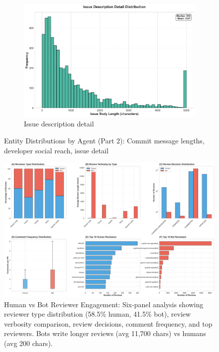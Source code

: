 \documentclass[11pt]{article}
\begin{document}
\begin{figure}[H]
\begin{subfigure}[b]{0.48\textwidth}
\centering
\includegraphics[width=\textwidth]{figures_individual/39_entity_issue_description_detail.png}
\caption{Issue description detail}
\label{fig:entity_issue}
\end{subfigure}

\caption{Entity Distributions by Agent (Part 2): Commit message lengths, developer social reach, issue detail}
\label{fig:entity_dist_part2}
\end{figure}

\begin{figure}[H]
\centering
\includegraphics[width=\textwidth]{figures/fig5_human_vs_bot_engagement.png}
\caption{Human vs Bot Reviewer Engagement: Six-panel analysis showing reviewer type distribution (58.5\% human, 41.5\% bot), review verbosity comparison, review decisions, comment frequency, and top reviewers. Bots write longer reviews (avg 11,700 chars) vs humans (avg 200 chars).}
\label{fig:human_bot}
\end{figure}
\end{document}
